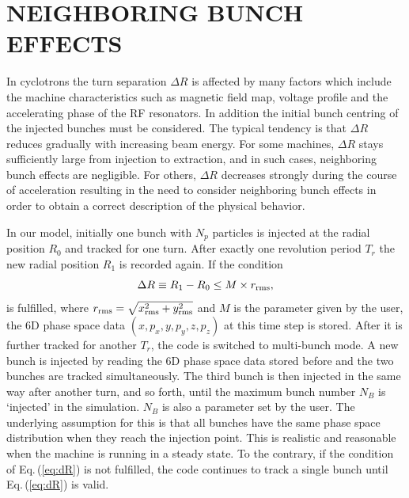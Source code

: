 \documentclass{JAC2003}
\begin{document}
\section{NEIGHBORING BUNCH EFFECTS}

In cyclotrons the turn separation $\Delta R$ is affected by many factors which include the machine characteristics such as magnetic field map, 
voltage profile and the accelerating phase of the RF resonators. In addition the initial bunch centring of the injected bunches must be considered. 
The typical tendency is that  $\Delta R$ reduces gradually  with increasing beam energy.
For some machines, $\Delta R$ stays sufficiently large from injection to extraction, and in such cases,  neighboring bunch effects are negligible. 
For others, $\Delta R$ decreases strongly during the course of acceleration resulting in the need to consider neighboring bunch effects in order to
obtain a correct description of the physical behavior.

In our model, initially one bunch with $N_p$ particles is injected at the radial position $R_0$ and tracked for one turn. 
After exactly one revolution period $T_{r}$ the new radial position $R_1$ is recorded again. If the condition
\begin{equation}\label{eq:dR}
  \Delta R \equiv R_1-R_0 \le M \times r_{\RM{rms}},
\end{equation}
is fulfilled, where $r_{\RM{rms}}=\sqrt{x_{\RM{rms}}^{2}+y_{\RM{rms}}^2}$ and $M$ is the parameter given by the user, the 6D phase space data $(x, p_x, y, p_y, z, p_z)$ at this time step is stored. 
After it is further tracked for another $T_{r}$, the code is switched to multi-bunch mode. 
A new bunch is injected by reading the 6D phase space data stored before and the two bunches are tracked simultaneously.
The third bunch is then injected in the same way after another turn, and so forth, until the maximum bunch number $N_B$ is `injected' in the simulation. $N_B$ is also a parameter set by the user.
The underlying assumption for this is that all bunches have the same phase space distribution when they reach the injection point.
This is realistic and reasonable when the machine is running in a steady state.  
To the contrary, if the condition of Eq.\,(\ref{eq:dR}) is not fulfilled, the code continues to track a single bunch until Eq.\,(\ref{eq:dR}) is valid. 
  
\end{document}
